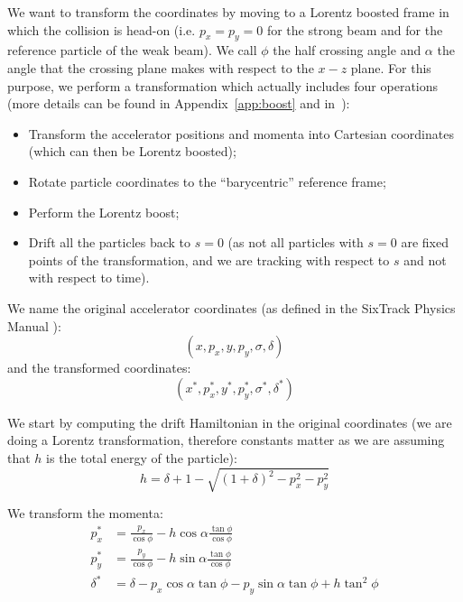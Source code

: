 We want to transform the coordinates by moving to a Lorentz boosted frame in which the collision is head-on (i.e. $p_x=p_y=0$ for the strong beam and for the reference particle of the weak beam). We call $\phi$ the half crossing angle and $\alpha$ the angle that the crossing plane makes with respect to the $x-z$ plane. For this purpose, we perform a transformation which actually includes four operations (more details can be found in Appendix~\ref{app:boost} and in~\cite{bb6dslides, beam_beam}):
\begin{itemize}
\item Transform the accelerator positions and momenta into Cartesian coordinates (which can then be Lorentz boosted);
\item Rotate particle coordinates to the ``barycentric'' reference frame;
\item Perform the Lorentz boost;
\item Drift all the particles back to $s=0$ (as not all particles with $s=0$ are fixed points of the transformation, and we are tracking with respect to $s$ and not with respect to time).
\end{itemize}

We name the original accelerator coordinates (as defined in the SixTrack Physics Manual \cite{sixtracksite}):
\begin{equation}
\left(x, p_x, y, p_y, \sigma, \delta\right)
\end{equation}
and the transformed coordinates:
\begin{equation}
\left(x^*, p_x^*, y^*, p_y^*, \sigma^*, \delta^*\right)
\end{equation}



We start by computing the drift Hamiltonian in the original coordinates (we are doing a Lorentz transformation, therefore constants matter as we are assuming that $h$ is the total energy of the particle):
\begin{equation}
h = \delta + 1 -\sqrt{\left(1+\delta\right)^2-p_x^2-p_y^2}
\end{equation}

We transform the momenta:
\begin{align}
p_x^* &= \frac{p_x}{\cos \phi} - h \cos \alpha \frac{\tan \phi}{\cos \phi} \label{eq:px}\\ 
p_y^* & = \frac{p_y}{\cos \phi} - h \sin \alpha \frac{\tan \phi}{\cos \phi}\\ 
\delta^* & = \delta -p_x \cos \alpha \tan \phi - p_y \sin \alpha \tan \phi +h \tan^2 \phi \label{eq:delta}
\end{align}


